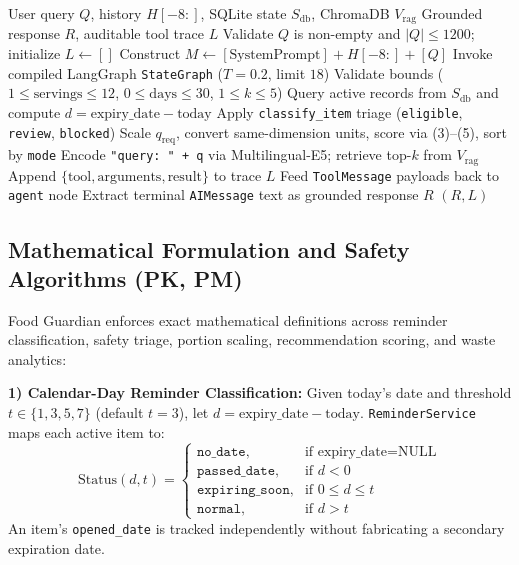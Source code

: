 \documentclass[conference]{IEEEtran}
\begin{document}
\begin{algorithm}[t]
\caption{Knowledge-Guided Domain AI Agent Execution}
\label{alg:agent}
\begin{algorithmic}[1]
\REQUIRE User query $Q$, history $H[-8:]$, SQLite state $S_{\text{db}}$, ChromaDB $V_{\text{rag}}$
\ENSURE Grounded response $R$, auditable tool trace $L$
\STATE Validate $Q$ is non-empty and $|Q| \le 1200$; initialize $L \leftarrow []$
\STATE Construct $M \leftarrow [\text{SystemPrompt}] + H[-8:] + [Q]$
\STATE Invoke compiled LangGraph \texttt{StateGraph} ($T=0.2$, limit $18$)
        \STATE Validate bounds ($1 \le \text{servings} \le 12$, $0 \le \text{days} \le 30$, $1 \le k \le 5$)
            \STATE Query active records from $S_{\text{db}}$ and compute $d = \text{expiry\_date} - \text{today}$
            \STATE Apply \texttt{classify\_item} triage (\texttt{eligible}, \texttt{review}, \texttt{blocked})
            \STATE Scale $q_{\text{req}}$, convert same-dimension units, score via (3)--(5), sort by \texttt{mode}
            \STATE Encode \texttt{"query: " + q} via Multilingual-E5; retrieve top-$k$ from $V_{\text{rag}}$
        \ENDIF
        \STATE Append $\{\text{tool}, \text{arguments}, \text{result}\}$ to trace $L$
    \ENDFOR
    \STATE Feed \texttt{ToolMessage} payloads back to \texttt{agent} node
\ENDWHILE
\STATE Extract terminal \texttt{AIMessage} text as grounded response $R$
\RETURN $(R, L)$
\end{algorithmic}
\end{algorithm}

\subsection{Mathematical Formulation and Safety Algorithms (PK, PM)}
Food Guardian enforces exact mathematical definitions across reminder classification, safety triage, portion scaling, recommendation scoring, and waste analytics:

\textbf{1) Calendar-Day Reminder Classification:} Given today's date and threshold $t \in \{1, 3, 5, 7\}$ (default $t = 3$), let $d = \text{expiry\_date} - \text{today}$. \texttt{ReminderService} maps each active item to:
\begin{equation}
\text{Status}(d, t) =
\begin{cases}
\texttt{no\_date}, & \text{if } \text{expiry\_date} = \text{NULL} \\
\texttt{passed\_date}, & \text{if } d < 0 \\
\texttt{expiring\_soon}, & \text{if } 0 \le d \le t \\
\texttt{normal}, & \text{if } d > t
\end{cases}
\end{equation}
An item's \texttt{opened\_date} is tracked independently without fabricating a secondary expiration date.
\end{document}

